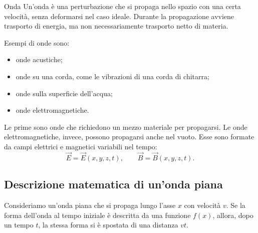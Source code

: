 \documentclass[a4paper]{article}
\begin{document}
\begin{snippetdefinition}{Onda}
Un'onda è una perturbazione che si propaga nello spazio con una certa velocità, senza deformarsi nel caso ideale. Durante la propagazione avviene trasporto di energia, ma non necessariamente trasporto netto di materia.
\end{snippetdefinition}

Esempi di onde sono:
\begin{itemize}
\item onde acustiche;
\item onde su una corda, come le vibrazioni di una corda di chitarra;
\item onde sulla superficie dell'acqua;
\item onde elettromagnetiche.
\end{itemize}

Le prime sono onde che richiedono un mezzo materiale per propagarsi. Le onde elettromagnetiche, invece, possono propagarsi anche nel vuoto. Esse sono formate da campi elettrici e magnetici variabili nel tempo:
\[
\vec{E}=\vec{E}(x,y,z,t),
\qquad
\vec{B}=\vec{B}(x,y,z,t).
\]

\subsection{Descrizione matematica di un'onda piana}

Consideriamo un'onda piana che si propaga lungo l'asse \(x\) con velocità \(v\). Se la forma dell'onda al tempo iniziale è descritta da una funzione \(f(x)\), allora, dopo un tempo \(t\), la stessa forma si è spostata di una distanza \(vt\).

\begin{center}
\end{center}

\begin{center}
\end{center}
\end{document}

